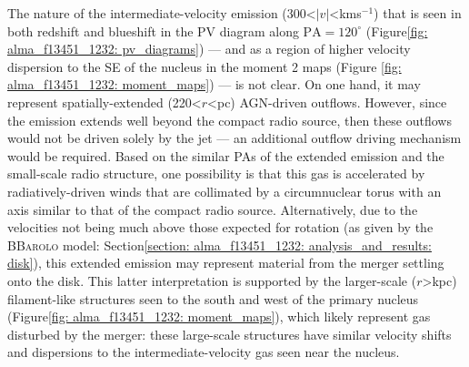The nature of the intermediate-velocity emission (300\;\textless\;$|v|$\;\textless{}\;km\;s$^{-1}$) that is seen in both redshift and blueshift in the PV diagram along $\mathrm{PA}=120^\circ$ (Figure\;\ref{fig: alma_f13451_1232: pv_diagrams}) --- and as a region of higher velocity dispersion to the SE of the nucleus in the moment 2 maps (Figure \ref{fig: alma_f13451_1232: moment_maps}) --- is not clear. On one hand, it may represent spatially-extended (220\;\textless\;$r$\;\textless{}\;pc) AGN-driven outflows. However, since the emission extends well beyond the compact radio source, then these outflows would not be driven solely by the jet --- an additional outflow driving mechanism would be required. Based on the similar PAs of the extended emission and the small-scale radio structure, one possibility is that this gas is accelerated by radiatively-driven winds that are collimated by a circumnuclear torus with an axis similar to that of the compact radio source.  Alternatively, due to the velocities not being much above those expected for rotation (as given by the \textsc{BBarolo} model: Section\;\ref{section: alma_f13451_1232: analysis_and_results: disk}), this extended emission may represent material from the merger settling onto the disk. This latter interpretation is supported by the larger-scale ($r$\;\textgreater{}\;kpc) filament-like structures seen to the south and west of the primary nucleus (Figure\;\ref{fig: alma_f13451_1232: moment_maps}), which likely represent gas disturbed by the merger: these large-scale structures have similar velocity shifts and dispersions to the intermediate-velocity gas seen near the nucleus.

